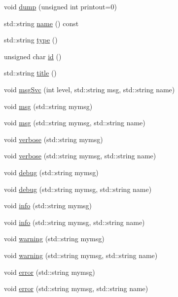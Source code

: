 \begin{DoxyCompactItemize}
\item 
void \hyperlink{classIOdata_a208e24222bf2044a4ff8bbb1a6bdc13b}{dump} (unsigned int printout=0)
\item 
std::string \hyperlink{classObject_a975e888d50bfcbffda2c86368332a5cd}{name} () const 
\item 
std::string \hyperlink{classObject_a84f99f70f144a83e1582d1d0f84e4e62}{type} ()
\item 
unsigned char \hyperlink{classObject_af99145335cc61ff6e2798ea17db009d2}{id} ()
\item 
std::string \hyperlink{classObject_a73a0f1a41828fdd8303dd662446fb6c3}{title} ()
\item 
void \hyperlink{classObject_a3f9d5537ebce0c0f2bf6ae4d92426f3c}{msgSvc} (int level, std::string msg, std::string name)
\item 
void \hyperlink{classObject_a58b2d0618c2d08cf2383012611528d97}{msg} (std::string mymsg)
\item 
void \hyperlink{classObject_ac5d59299273cee27aacf7de00d2e7034}{msg} (std::string mymsg, std::string name)
\item 
void \hyperlink{classObject_a83d2db2df682907ea1115ad721c1c4a1}{verbose} (std::string mymsg)
\item 
void \hyperlink{classObject_a2d4120195317e2a3c6532e8bb9f3da68}{verbose} (std::string mymsg, std::string name)
\item 
void \hyperlink{classObject_aac010553f022165573714b7014a15f0d}{debug} (std::string mymsg)
\item 
void \hyperlink{classObject_a6c9a0397ca804e04d675ed05683f5420}{debug} (std::string mymsg, std::string name)
\item 
void \hyperlink{classObject_a644fd329ea4cb85f54fa6846484b84a8}{info} (std::string mymsg)
\item 
void \hyperlink{classObject_a1ca123253dfd30fc28b156f521dcbdae}{info} (std::string mymsg, std::string name)
\item 
void \hyperlink{classObject_a65cd4fda577711660821fd2cd5a3b4c9}{warning} (std::string mymsg)
\item 
void \hyperlink{classObject_a11f101db4dd73d9391b0231818881d86}{warning} (std::string mymsg, std::string name)
\item 
void \hyperlink{classObject_a204a95f57818c0f811933917a30eff45}{error} (std::string mymsg)
\item 
void \hyperlink{classObject_ad7f6c457733082efa2f9ff5f5c8e119a}{error} (std::string mymsg, std::string name)
\item 

\end{DoxyCompactItemize}
